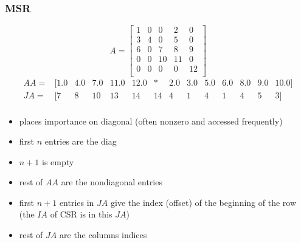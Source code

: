 \documentclass[10pt]{beamer}
\begin{document}
\begin{frame}
\frametitle{MSR}
\begin{equation*}
A=
\begin{bmatrix}
1 & 0 & 0 & 2 & 0\\
3 & 4 & 0 & 5 & 0\\
6 & 0 & 7 & 8 & 9\\
0 & 0 & 10 & 11 & 0\\
0 & 0 & 0 & 0 & 12\\
\end{bmatrix}
\end{equation*}
\begin{equation*}
\begin{array}{llllllllllllll}
  AA = & [ 1.0 & 4.0 & 7.0 & 11.0 & 12.0 & *  & 2.0 & 3.0 & 5.0 & 6.0 & 8.0 & 9.0 & 10.0 ]\\
  JA = & [   7 & 8   & 10  & 13   & 14   & 14 & 4   & 1   & 4   & 1   & 4   & 5   & 3 ]\\
\end{array}
\end{equation*}
  \begin{itemize}
    \item places importance on diagonal (often nonzero and accessed
frequently)
    \item first $n$ entries are the diag
    \item $n+1$ is empty
    \item rest of $AA$ are the nondiagonal entries
    \item first $n+1$ entries in $JA$ give the index (offset) of the beginning
      of the row (the $IA$ of CSR is in this $JA$)
    \item rest of $JA$ are the columns indices
  \end{itemize}
\end{frame}
\end{document}
